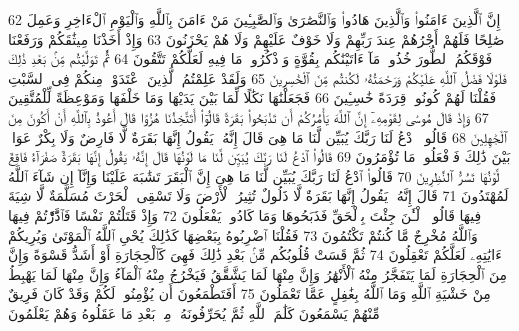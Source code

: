 {\tiny\colorbox{cl_aya}{62}} إِنَّ ٱلَّذِينَ ءَامَنُوا۟ وَٱلَّذِينَ هَادُوا۟ وَٱلنَّصَٰرَىٰ وَٱلصَّٰبِـِٔينَ مَنْ ءَامَنَ بِٱللَّهِ وَٱلْيَوْمِ ٱلْءَاخِرِ وَعَمِلَ صَٰلِحًا فَلَهُمْ أَجْرُهُمْ عِندَ رَبِّهِمْ وَلَا خَوْفٌ عَلَيْهِمْ وَلَا هُمْ يَحْزَنُونَ
{\tiny\colorbox{cl_aya}{63}} وَإِذْ أَخَذْنَا مِيثَٰقَكُمْ وَرَفَعْنَا فَوْقَكُمُ ٱلطُّورَ خُذُوا۟ مَآ ءَاتَيْنَٰكُم بِقُوَّةٍ وَٱذْكُرُوا۟ مَا فِيهِ لَعَلَّكُمْ تَتَّقُونَ
{\tiny\colorbox{cl_aya}{64}} ثُمَّ تَوَلَّيْتُم مِّنۢ بَعْدِ ذَٰلِكَ فَلَوْلَا فَضْلُ ٱللَّهِ عَلَيْكُمْ وَرَحْمَتُهُۥ لَكُنتُم مِّنَ ٱلْخَٰسِرِينَ
{\tiny\colorbox{cl_aya}{65}} وَلَقَدْ عَلِمْتُمُ ٱلَّذِينَ ٱعْتَدَوْا۟ مِنكُمْ فِى ٱلسَّبْتِ فَقُلْنَا لَهُمْ كُونُوا۟ قِرَدَةً خَٰسِـِٔينَ
{\tiny\colorbox{cl_aya}{66}} فَجَعَلْنَٰهَا نَكَٰلًا لِّمَا بَيْنَ يَدَيْهَا وَمَا خَلْفَهَا وَمَوْعِظَةً لِّلْمُتَّقِينَ
{\tiny\colorbox{cl_aya}{67}} وَإِذْ قَالَ مُوسَىٰ لِقَوْمِهِۦٓ إِنَّ ٱللَّهَ يَأْمُرُكُمْ أَن تَذْبَحُوا۟ بَقَرَةً قَالُوٓا۟ أَتَتَّخِذُنَا هُزُوًا قَالَ أَعُوذُ بِٱللَّهِ أَنْ أَكُونَ مِنَ ٱلْجَٰهِلِينَ
{\tiny\colorbox{cl_aya}{68}} قَالُوا۟ ٱدْعُ لَنَا رَبَّكَ يُبَيِّن لَّنَا مَا هِىَ قَالَ إِنَّهُۥ يَقُولُ إِنَّهَا بَقَرَةٌ لَّا فَارِضٌ وَلَا بِكْرٌ عَوَانٌۢ بَيْنَ ذَٰلِكَ فَٱفْعَلُوا۟ مَا تُؤْمَرُونَ
{\tiny\colorbox{cl_aya}{69}} قَالُوا۟ ٱدْعُ لَنَا رَبَّكَ يُبَيِّن لَّنَا مَا لَوْنُهَا قَالَ إِنَّهُۥ يَقُولُ إِنَّهَا بَقَرَةٌ صَفْرَآءُ فَاقِعٌ لَّوْنُهَا تَسُرُّ ٱلنَّٰظِرِينَ
{\tiny\colorbox{cl_aya}{70}} قَالُوا۟ ٱدْعُ لَنَا رَبَّكَ يُبَيِّن لَّنَا مَا هِىَ إِنَّ ٱلْبَقَرَ تَشَٰبَهَ عَلَيْنَا وَإِنَّآ إِن شَآءَ ٱللَّهُ لَمُهْتَدُونَ
{\tiny\colorbox{cl_aya}{71}} قَالَ إِنَّهُۥ يَقُولُ إِنَّهَا بَقَرَةٌ لَّا ذَلُولٌ تُثِيرُ ٱلْأَرْضَ وَلَا تَسْقِى ٱلْحَرْثَ مُسَلَّمَةٌ لَّا شِيَةَ فِيهَا قَالُوا۟ ٱلْـَٰٔنَ جِئْتَ بِٱلْحَقِّ فَذَبَحُوهَا وَمَا كَادُوا۟ يَفْعَلُونَ
{\tiny\colorbox{cl_aya}{72}} وَإِذْ قَتَلْتُمْ نَفْسًا فَٱدَّٰرَْٰٔتُمْ فِيهَا وَٱللَّهُ مُخْرِجٌ مَّا كُنتُمْ تَكْتُمُونَ
{\tiny\colorbox{cl_aya}{73}} فَقُلْنَا ٱضْرِبُوهُ بِبَعْضِهَا كَذَٰلِكَ يُحْىِ ٱللَّهُ ٱلْمَوْتَىٰ وَيُرِيكُمْ ءَايَٰتِهِۦ لَعَلَّكُمْ تَعْقِلُونَ
{\tiny\colorbox{cl_aya}{74}} ثُمَّ قَسَتْ قُلُوبُكُم مِّنۢ بَعْدِ ذَٰلِكَ فَهِىَ كَٱلْحِجَارَةِ أَوْ أَشَدُّ قَسْوَةً وَإِنَّ مِنَ ٱلْحِجَارَةِ لَمَا يَتَفَجَّرُ مِنْهُ ٱلْأَنْهَٰرُ وَإِنَّ مِنْهَا لَمَا يَشَّقَّقُ فَيَخْرُجُ مِنْهُ ٱلْمَآءُ وَإِنَّ مِنْهَا لَمَا يَهْبِطُ مِنْ خَشْيَةِ ٱللَّهِ وَمَا ٱللَّهُ بِغَٰفِلٍ عَمَّا تَعْمَلُونَ
{\tiny\colorbox{cl_aya}{75}} أَفَتَطْمَعُونَ أَن يُؤْمِنُوا۟ لَكُمْ وَقَدْ كَانَ فَرِيقٌ مِّنْهُمْ يَسْمَعُونَ كَلَٰمَ ٱللَّهِ ثُمَّ يُحَرِّفُونَهُۥ مِنۢ بَعْدِ مَا عَقَلُوهُ وَهُمْ يَعْلَمُونَ
